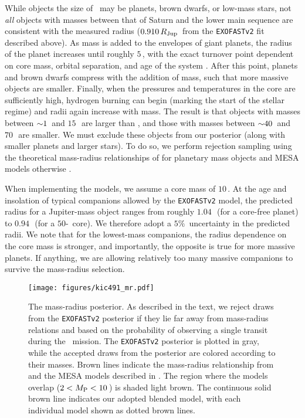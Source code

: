 \documentclass[twocolumn]{aastex63}
\begin{document}
While objects the size of \thisstarb\ may be planets, brown dwarfs, or low-mass stars, not {\it all} objects with masses between that of Saturn and the lower main sequence are consistent with the measured radius ($0.910\,\rjup$\ from the \texttt{EXOFASTv2} fit described above). As mass is added to the envelopes of giant planets, the radius of the planet increases until roughly $5$\,\mjup, with the exact turnover point dependent on core mass, orbital separation, and age of the system \citep[see, e.g.,][hereafter ]{fortney:2007}. After this point, planets and brown dwarfs compress with the addition of mass, such that more massive objects are smaller. Finally, when the pressures and temperatures in the core are sufficiently high, hydrogen burning can begin (marking the start of the stellar regime) and radii again increase with mass. The result is that objects with masses between $\mathord{\sim} 1$\ and $15$\,\mjup\ are larger than \thisstarb, and those with masses between $\mathord{\sim} 40$\ and $70$\,\mjup\ are smaller. We must exclude these objects from our posterior (along with smaller planets and larger stars). To do so, we perform rejection sampling using the theoretical mass-radius relationships of  for planetary mass objects and MESA models otherwise \citep[those generated for the work in][which extend from $\mysim 2$\ to $100$\,\mjup]{nelson:2018}.

When implementing the  models, we assume a core mass of $10$\,\mearth. At the age and insolation of typical companions allowed by the \texttt{EXOFASTv2} model, the predicted radius for a Jupiter-mass object ranges from roughly $1.04$\,\rjup\ (for a core-free planet) to $0.94$\,\rjup\ (for a $50$-\mearth\ core). We therefore adopt a $5\%$\ uncertainty in the predicted radii. We note that for the lowest-mass companions, the radius dependence on the core mass is stronger, and importantly, the opposite is true for more massive planets. If anything, we are allowing relatively too many massive companions to survive the mass-radius selection. 

\begin{figure}[!t]
    \centering
    \texttt{[image: figures/kic491\_mr.pdf]}
    \caption{The mass-radius posterior. As described in the text, we reject draws from the \texttt{EXOFASTv2} posterior if they lie far away from mass-radius relations and based on the probability of observing a single transit during the \kep\ mission. The \texttt{EXOFASTv2} posterior is plotted in gray, while the accepted draws from the posterior are colored according to their masses. Brown lines indicate the mass-radius relationship from \citet{fortney:2007} and the MESA models described in \citet{nelson:2018}. The region where the models overlap ($2 < \mpl < 10$\,\mjup) is shaded light brown. The continuous solid brown line indicates our adopted blended model, with each individual model shown as dotted brown lines.}
    \label{fig:mr}
\end{figure}
\end{document}
